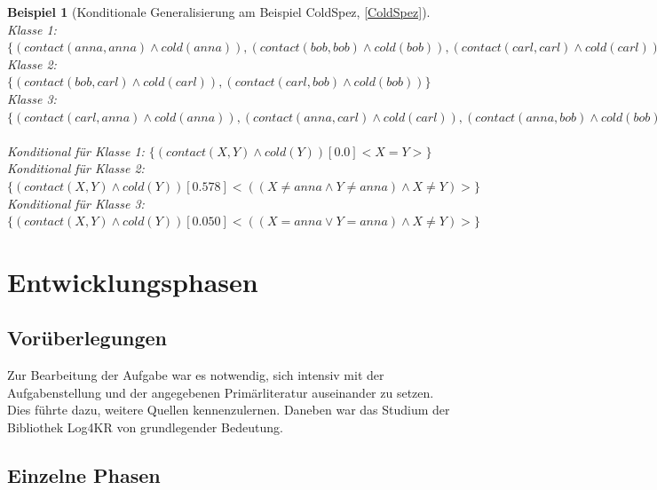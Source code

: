\documentclass[a4paper, 11pt]{book}
\newtheorem{Bsp}{Beispiel}[section]
\begin{document}
\begin{itemize}
\begin{Bsp}[Konditionale Generalisierung am Beispiel ColdSpez, \ref{ColdSpez}]
			Klasse 1: $ \{(contact(anna,anna) \land cold(anna)), (contact(bob,bob) \land cold(bob)), (contact(carl,carl) \land cold(carl)) \} $\\
			Klasse 2: $ \{(contact(bob,carl) \land cold(carl)), (contact(carl,bob) \land cold(bob)) \} $\\
			Klasse 3: $ \{(contact(carl,anna) \land cold(anna)), (contact(anna, carl) \land cold(carl)), (contact(anna,bob) \land cold(bob)), (contact(bob, anna) \land cold(anna)) \} $\\
			\\
			\noindent
			Konditional für Klasse 1: $ \{(contact(X,Y) \land cold(Y)) [0.0] <X = Y>\} $\\
			Konditional für Klasse 2: $ \{(contact(X,Y) \land cold(Y)) [0.578] <((X \neq anna \land Y \neq anna) \land X \neq Y)>\} $\\
			Konditional für Klasse 3: $ \{(contact(X,Y) \land cold(Y)) [0.050] <((X = anna \lor Y = anna)\land X \neq Y)>\} $	
		\end{Bsp}
	
\end{itemize}

\chapter{Entwicklungsphasen}\label{Dok}
\section{Vorüberlegungen}
Zur Bearbeitung der Aufgabe war es notwendig, sich intensiv mit der Aufgabenstellung und der angegebenen Primärliteratur auseinander zu setzen. Dies führte dazu, weitere Quellen kennenzulernen. Daneben war das Studium der Bibliothek Log4KR von grundlegender Bedeutung. 
\section{Einzelne Phasen}
\end{document}
